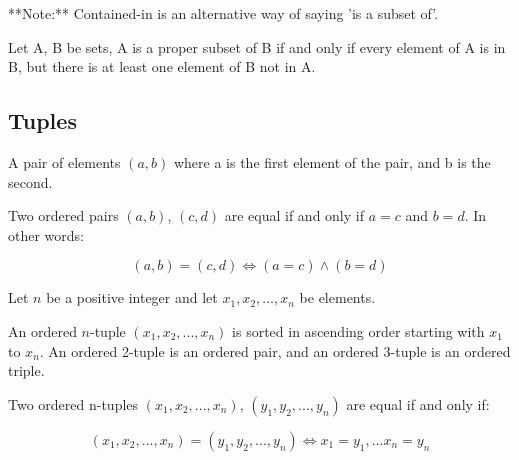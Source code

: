 \documentclass[11pt]{article}
\begin{document}

\starON
**Note:** Contained-in is an alternative way of saying 'is a subset of'.
\starOFF

\begin{definition}\label{def:proper-subset-txt}
Let A, B be sets, A is a proper subset of B if and only if every element of A is in B, but there
is at least one element of B not in A.
\end{definition}

\subsection{Tuples}

\begin{definition}\label{def:ordered-pair}
    A pair of elements $(a, b)$ where a is the first
    element of the pair, and b is the second. 
\end{definition}

\begin{definition}\label{def:ordered-pair-eq}
    Two ordered pairs $(a,b)$, $(c,d)$ are equal if and only if
    $a = c$ and $b = d$. In other words:

    \begin{equation}
        (a,b) = (c,d) \iff (a = c) \land (b = d)
    \end{equation}
\end{definition}

\begin{definition}[Tuples]\label{def:tuple}
    Let $n$ be a positive integer and let $x_1, x_2, ... , x_n$ be elements.

    An ordered $n$-tuple $(x_1, x_2, ... , x_n)$ is sorted in ascending order
    starting with $x_1$ to $x_n$. An ordered 2-tuple is an ordered pair,
    and an ordered 3-tuple is an ordered triple.
\end{definition}

\begin{definition}\label{def:tuple-eq}
    Two ordered n-tuples $(x_1, x_2, ..., x_n)$, $(y_1, y_2, ..., y_n)$
    are equal if and only if:

    \begin{equation}
        (x_1, x_2, ..., x_n) = (y_1, y_2, ..., y_n) \iff x_1 = y_1, ... x_n = y_n
    \end{equation}
\end{definition}
\end{document}
